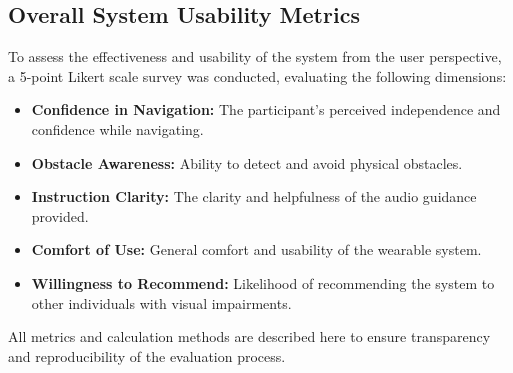 \subsection{Overall System Usability Metrics}
To assess the effectiveness and usability of the system from the user perspective, a 5-point Likert scale survey was conducted, evaluating the following dimensions:
\begin{itemize}
	\item \textbf{Confidence in Navigation:} The participant’s perceived independence and confidence while navigating.
	\item \textbf{Obstacle Awareness:} Ability to detect and avoid physical obstacles.
	\item \textbf{Instruction Clarity:} The clarity and helpfulness of the audio guidance provided.
	\item \textbf{Comfort of Use:} General comfort and usability of the wearable system.
	\item \textbf{Willingness to Recommend:} Likelihood of recommending the system to other individuals with visual impairments.
\end{itemize}

All metrics and calculation methods are described here to ensure transparency and reproducibility of the evaluation process.
